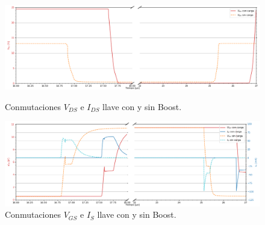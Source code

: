 \begin{figure}[H]
	\centering
	\begin{minipage}{0.495\textwidth}
		\centering
		\includegraphics[width=\linewidth]{ImagenesEjercicio-3/ids-vds-1v3}
		\caption{Conmutaciones $V_{DS}$ e  $I_{DS}$ llave con y sin Boost.}
		\label{fig:ej3:conmutacionON_OFF_VDS_IDS_SWITCH_BOOST}
	\end{minipage}\hfill
	\begin{minipage}{0.495\textwidth}
		\centering
		\includegraphics[width=\linewidth]{ImagenesEjercicio-3/ig-vgs-1v3}
		\caption{Conmutaciones $V_{GS}$ e  $I_{S}$ llave con y sin Boost.}
		\label{fig:ej3:conmutacionON_OFF_VGS_IG_SWITCH_BOOST}
	\end{minipage}\hfill
\end{figure}
